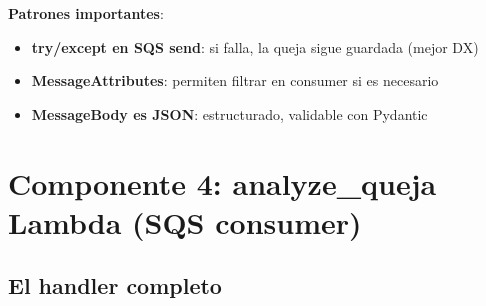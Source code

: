 \documentclass[11pt,a4paper,oneside]{article}
\newcommand{\ok}{\textcolor{okgreen}{\textbf{\checkmark}}}
\begin{document}
\textbf{Patrones importantes}:
\begin{itemize}
  \item \ok \textbf{try/except en SQS send}: si falla, la queja sigue guardada (mejor DX)
  \item \ok \textbf{MessageAttributes}: permiten filtrar en consumer si es necesario
  \item \ok \textbf{MessageBody es JSON}: estructurado, validable con Pydantic
\end{itemize}

\section{Componente 4: analyze\_queja Lambda (SQS consumer)}

\subsection{El handler completo}
\end{document}
